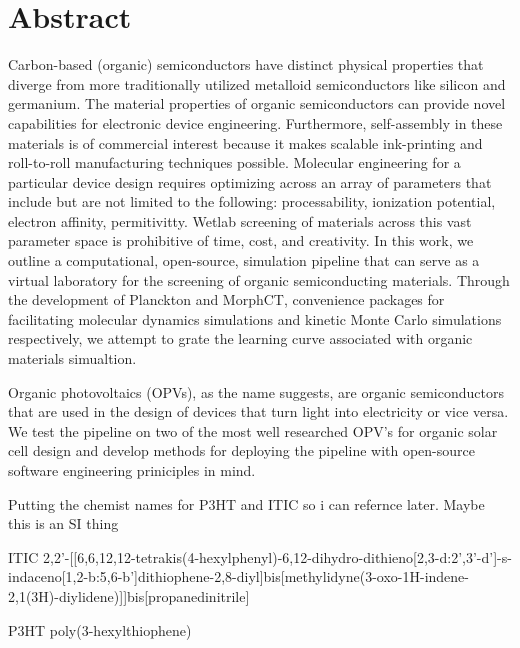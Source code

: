 
\chapter*{Abstract}

Carbon-based (organic) semiconductors have distinct physical properties that diverge from more traditionally
utilized metalloid semiconductors like silicon and germanium.
The material properties of organic semiconductors can provide novel capabilities
for electronic device engineering. Furthermore, 
self-assembly in these materials is of commercial interest because it makes scalable ink-printing and
roll-to-roll manufacturing techniques possible.
Molecular engineering for a particular device design
requires optimizing across an array of parameters that include but are
not limited to the following: processability, ionization potential, electron affinity, permitivitty. 
Wetlab screening of materials across
this vast parameter space is prohibitive of time, cost, and creativity. 
In this work, we outline a computational, open-source, simulation pipeline that can serve as a 
virtual laboratory for the screening of organic semiconducting materials. 
Through the development of Planckton and MorphCT, convenience packages for facilitating molecular dynamics
simulations and kinetic Monte Carlo simulations respectively, we attempt to grate the learning curve
associated with organic materials simualtion. 

Organic photovoltaics (OPVs), as the name suggests, are organic semiconductors that are used in the design of
devices that turn light into electricity or vice versa.  
We test the pipeline on
two of the most well researched OPV's for organic solar cell design and develop methods for deploying
the pipeline with open-source software engineering priniciples in mind.


Putting the chemist names for P3HT and ITIC so i can refernce later. Maybe this is an SI thing

ITIC
2,2'-[[6,6,12,12-tetrakis(4-hexylphenyl)-6,12-dihydro-dithieno[2,3-d:2',3'-d']-s-indaceno[1,2-b:5,6-b']dithiophene-2,8-diyl]bis[methylidyne(3-oxo-1H-indene-2,1(3H)-diylidene)]]bis[propanedinitrile]

P3HT poly(3-hexylthiophene)




